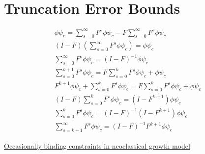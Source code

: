 \documentclass[12pt]{article}
\begin{document}
\section{Truncation Error Bounds}
\label{truncForm}
{
\begin{gather*}
\phi \psi_c=  \sum_{s=0}^\infty F^s \phi \psi_c  -   F \sum_{s=0}^\infty F^s \phi \psi_c \\
(I-F) \left (\sum_{s=0}^\infty F^s \phi \psi_c \right ) =\phi \psi_c\\
\sum_{s=0}^\infty F^s \phi \psi_c=(I - F)^{-1}\phi \psi_c\\
\sum_{s=0}^{k+1} F^s \phi \psi_c=F \sum_{s=0}^{k} F^s \phi \psi_c + \phi \psi_c\\
F^{k+1} \phi \psi_c +\sum_{s=0}^{k} F^s \phi \psi_c=F \sum_{s=0}^{k} F^s \phi \psi_c + \phi \psi_c\\
(I -F)\sum_{s=0}^{k} F^s\phi \psi_c  = (I- F^{k+1}) \phi \psi_c\\
\sum_{s=0}^{k} F^s \phi \psi_c = (I -F)^{-1}(I- F^{k+1}) \phi \psi_c\\
\sum_{s=k+1}^{\infty} F^s \phi \psi_c = (I -F)^{-1} F^{k+1}\phi \psi_c
\end{gather*}
}


\newpage

\href{http://www.dynare.org/DynareShanghai2013/deterministic.pdf}{Occasionally binding constraints in neoclassical growth model}

 
 
\end{document}
